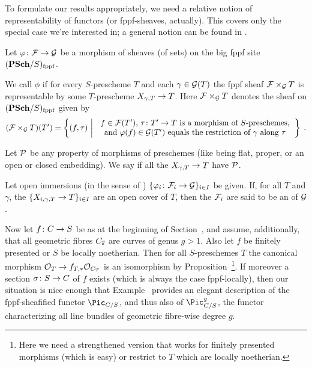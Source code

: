 \documentclass[a4paper,parskip=half,numbers=enddot, DIV=12]{scrreprt}
\begin{document}
To formulate our results appropriately, we need a relative notion of representability of functors (or fppf-sheaves, actually). This covers only the special case we're interested in; a general notion can be found in \cite[]{stacks-project}.
\begin{defi}
	Let $\phi\colon\Ff\morphism\Gg$ be a morphism of sheaves (of sets) on the big fppf site $(\cat{PSch}/S)_\fppf$.
	\begin{alphanumerate}
		\item We call $\phi$  if for every $S$-prescheme $T$ and each $\gamma\in\mathcal{G}(T)$ the fppf sheaf $\mathcal{F}\times_{\mathcal{G}} T$ is representable by some $T$-prescheme $X_{\gamma,T}\morphism T$. Here $\mathcal{F}\times_{\mathcal{G}} T$ denotes the sheaf on $(\cat{PSch}/S)_\fppf$ given by
		\begin{align*}
			(\Ff\times_\Gg T)(T')=\left\{(f,\tau)\st
		\begin{tabular}{c}
			$f\in \Ff(T')$, $\tau\colon T'\morphism T$ is a morphism of $S$-preschemes,\\
			 and $\phi(f)\in\Gg(T')$ equals the restriction of $\gamma$ along $\tau$
		\end{tabular}\right\}\;.
		\end{align*}
		\item Let $\mathcal{P}$ be any property of morphisms of preschemes (like being flat, proper, or an open or closed embedding). We say  if all the $X_{\gamma,T}\morphism T$ have $\mathcal{P}$.
		\item Let open immersions (in the sense of ) $\{\phi_i\colon \Ff_i\morphism \Gg\}_{i\in I}$ be given. If, for all $T$ and $\gamma$, the $\{X_{i,\gamma,T}\morphism T\}_{i\in I}$ are an open cover of $T$, then the $\mathcal{F}_i$ are said to be an  of $\mathcal{G}$.
	\end{alphanumerate}
\end{defi}
Now let $f\colon C\morphism S$ be as at the beginning of Section~, and assume, additionally, that all geometric fibres $C_{\overline{s}}$ are curves of genus $g>1$. Also let $f$ be finitely presented or $S$ be locally noetherian. Then for all $S$-preschemes $T$ the canonical morphism $\Oo_T\morphism f_{T,*}\Oo_{C_T}$ is an isomorphism by Proposition~\footnote{Here we need a strengthened version that works for finitely presented morphisms (which is easy) or restrict to $T$ which are locally noetherian.}. If moreover a section $\sigma\colon S\morphism C$ of $f$ exists (which is always the case fppf-locally), then our situation is nice enough that Example~ provides an elegant description of the fppf-sheafified functor $\Pic_{C/S}$, and thus also of $\Pic_{C/S}^g$, the functor characterizing all line bundles of geometric fibre-wise degree $g$.
\end{document}
